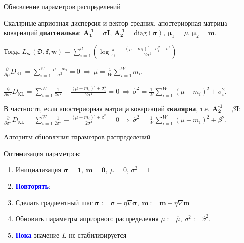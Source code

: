 \documentclass{beamer}
\newcommand{\DD}{{\mathfrak{D}}}
\newcommand{\bw}{{\textbf{w}}}
\newcommand{\II}{{\textbf{I}}}
\newcommand{\bbf}{{\textbf{f}}}
\newcommand{\bm}{{\textbf{m}}}
\newcommand{\bs}{{\boldsymbol{\sigma}}}
\newcommand{\bAo}{\mathbf{A^\text{-1}_\text{1}}}
\newcommand{\bAt}{\mathbf{A^\text{-1}_\text{2}}}
\newcommand{\bmuo}{{\boldsymbol{\mu}_1}}
\newcommand{\bmut}{{\boldsymbol{\mu}_2}}
\newcommand{\DKL}{\mathit{D}_{\text{KL}}}
\begin{document}
\begin{frame}{Обновление параметров распределений}

Скалярные априорная дисперсия и вектор средних, апостериорная матрица ковариаций \textbf{диагональна}: $\bAo = \sigma\II, \ \bAt = \text{diag}(\bs), \ \bmuo = \mu$, $\bmut = \bm$.

Тогда $L_\bw(\DD,\bbf,\bw) = \sum\limits_{i=1}^d(\log\frac{\sigma}{\sigma_i} + \frac{(\mu-m_i)^2 + \sigma_i^2 + \sigma^2}{2\sigma^2})$

$\frac\partial{\partial\mu}\DKL = \sum\limits_{i=1}^W\frac{\mu-m_i}{\sigma^2}=0 \ \Rightarrow \ \hat{\mu} = \frac1W\sum\limits_{i=1}^W m_i$.

$\frac\partial{\partial\sigma^2}\DKL = \sum\limits_{i=1}^W \frac1{2\sigma^2}-\frac{(\mu-m_i)^2 + \sigma_i^2}{2\sigma^4}=0 \ \Rightarrow \ \hat{\sigma}^2 = \frac1W\sum\limits_{i=1}^W (\mu-m_i)^2 + \sigma_i^2$.

\begin{block}{}
В частности, если апостериорная матрица ковариаций \textbf{скалярна}, т.е. $\bAt = \beta \II$:
$\frac\partial{\partial\sigma^2}\DKL = \sum\limits_{i=1}^W \frac1{2\sigma^2}-\frac{(\mu-m_i)^2 + \beta^2}{2\sigma^4}=0 \ \Rightarrow \ \hat{\sigma}^2 = \frac1W\sum\limits_{i=1}^W (\mu-m_i)^2 + \beta^2$.
\end{block}


\end{frame}

\begin{frame}{Алгоритм обновления параметров распределений}

Оптимизация параметров:

\begin{enumerate}
	\item Инициализация $\bs = \textbf{1}, \ \bm = \textbf{0}, \ \mu = 0, \ \sigma^2 = 1$
	
	\item \textcolor{blue}{\textbf{Повторять}}:
	
	\item Сделать градиентный шаг $\bs:=\bs-\eta\nabla\bs, \ \bm:=\bm-\eta\nabla\bm$
	
	\item Обновить параметры априорного распределения $\mu:= \hat{\mu}, \ \sigma^2:=\hat{\sigma}^2$.
	
	\item \textcolor{blue}{\textbf{Пока}} значение $L$ не стабилизируется
	

\end{enumerate}

\end{frame}
\end{document}
